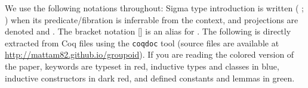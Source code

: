 
\begin{coqdoccode}
\end{coqdoccode}
We use the following notations throughout: Sigma type introduction
  is written ( ; ) when its predicate/fibration is inferrable from
  the context, and projections are denoted  and . The bracket
  notation [\coqdocvar{\_}] is an alias for . The following is directly
  extracted from Coq files using the \texttt{coqdoc} tool (source files
  are available at \url{http://mattam82.github.io/groupoid}). If
  you are reading the colored version of the paper, keywords are
  typeset in red, inductive types and classes in blue, inductive
  constructors in dark red, and defined constants and lemmas in green.
  \begin{coqdoccode}
\end{coqdoccode}
